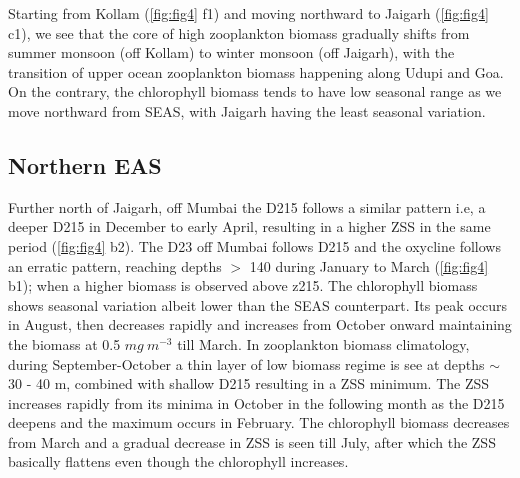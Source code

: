 \documentclass{article}
\begin{document}
	Starting from Kollam (\cref{fig:fig4} f1) and moving northward to Jaigarh (\cref{fig:fig4} c1), we see that the core of high zooplankton biomass gradually shifts from summer monsoon (off Kollam) to winter monsoon (off Jaigarh), with the transition of upper ocean zooplankton biomass happening along Udupi and Goa. On the contrary, the chlorophyll biomass tends to have low seasonal range as we move northward from SEAS, with Jaigarh having the least seasonal variation.
	 
	\subsection{Northern EAS}
	Further north of Jaigarh, off Mumbai the D215 follows a similar pattern i.e, a deeper D215 in December to early April, resulting in a higher ZSS in the same period (\cref{fig:fig4} b2). The D23 off Mumbai follows D215 and the oxycline follows an erratic pattern, reaching depths $>$ 140 during January to March (\cref{fig:fig4} b1); when a higher biomass is observed above z215. The chlorophyll biomass shows seasonal variation albeit lower than the SEAS counterpart. Its peak occurs in August, then decreases rapidly and increases from October onward maintaining the biomass at 0.5 $mg\ m^{-3}$ till March. In zooplankton biomass climatology, during September-October a thin layer of low biomass regime is see at depths $\sim$30 - 40 m, combined with shallow D215 resulting in a ZSS minimum. The ZSS increases rapidly from its minima in October in the following month as the D215 deepens and the maximum occurs in February. The chlorophyll biomass decreases from March and a gradual decrease in ZSS is seen till July, after which the ZSS basically flattens even though the chlorophyll increases. 
	
	 
\end{document}

